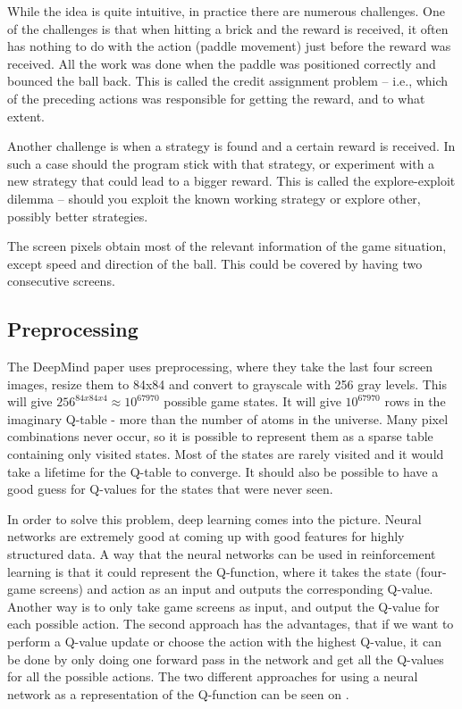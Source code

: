 While the idea is quite intuitive, in practice there are numerous challenges. One of the challenges is that when hitting a brick and the reward is received, it often has nothing to do with the action (paddle movement) just before the reward was received. All the work was done when the paddle was positioned correctly and bounced the ball back. This is called the credit assignment problem – i.e., which of the preceding actions was responsible for getting the reward, and to what extent. 

Another challenge is when a strategy is found and a certain reward is received. In such a case should the program stick with that strategy, or experiment with a new strategy that could lead to a bigger reward. This is called the explore-exploit dilemma – should you exploit the known working strategy or explore other, possibly better strategies.

The screen pixels obtain most of the relevant information of the game situation, except speed and direction of the ball. This could be covered by having two consecutive screens.

\subsection{Preprocessing}
The DeepMind paper uses preprocessing, where they take the last four screen images, resize them to 84x84 and convert to grayscale with 256 gray levels. This will give $256^{84x84x4} \approx 10^{67970}$ possible game states. It will give $10^{67970}$ rows in the imaginary Q-table - more than the number of atoms in the universe. Many pixel combinations never occur, so it is possible to represent them as a sparse table containing only visited states. Most of the states are rarely visited and it would take a lifetime for the Q-table to converge. It should also be possible to have a good guess for Q-values for the states that were never seen.  

In order to solve this problem, deep learning comes into the picture. Neural networks are extremely good at coming up with good features for highly structured data. A way that the neural networks can be used in reinforcement learning is that it could represent the Q-function, where it takes the state (four-game screens) and action as an input and outputs the corresponding Q-value. Another way is to only take game screens as input, and output the Q-value for each possible action. The second approach has the advantages, that if we want to perform a Q-value update or choose the action with the highest Q-value, it can be done by only doing one forward pass in the network and get all the Q-values for all the possible actions. The two different approaches for using a neural network as a representation of the Q-function can be seen on .               

